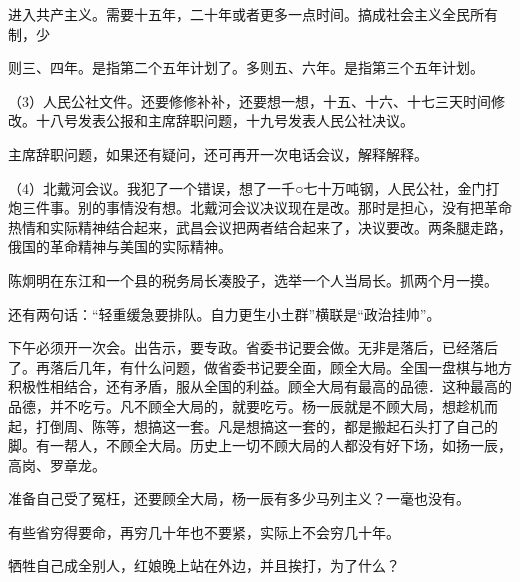 进入共产主义。需要十五年，二十年或者更多一点时间。搞成社会主义全民所有制，少

则三、四年。是指第二个五年计划了。多则五、六年。是指第三个五年计划。

（3）人民公社文件。还要修修补补，还要想一想，十五、十六、十七三天时间修改。十八号发表公报和主席辞职问题，十九号发表人民公社决议。

主席辞职问题，如果还有疑问，还可再开一次电话会议，解释解释。

（4）北戴河会议。我犯了一个错误，想了一千○七十万吨钢，人民公社，金门打炮三件事。别的事情没有想。北戴河会议决议现在是改。那时是担心，没有把革命热情和实际精神结合起来，武昌会议把两者结合起来了，决议要改。两条腿走路，俄国的革命精神与美国的实际精神。

陈炯明在东江和一个县的税务局长凑股子，选举一个人当局长。抓两个月一摸。

还有两句话：“轻重缓急要排队。自力更生小土群”横联是“政治挂帅”。

下午必须开一次会。出告示，要专政。省委书记要会做。无非是落后，已经落后了。再落后几年，有什么问题，做省委书记要全面，顾全大局。全国一盘棋与地方积极性相结合，还有矛盾，服从全国的利益。顾全大局有最高的品德．这种最高的品德，并不吃亏。凡不顾全大局的，就要吃亏。杨一辰就是不顾大局，想趁机而起，打倒周、陈等，想搞这一套。凡是想搞这一套的，都是搬起石头打了自己的脚。有一帮人，不顾全大局。历史上一切不顾大局的人都没有好下场，如扬一辰，高岗、罗章龙。

准备自己受了冤枉，还要顾全大局，杨一辰有多少马列主义？一毫也没有。

有些省穷得要命，再穷几十年也不要紧，实际上不会穷几十年。

牺牲自己成全别人，红娘晚上站在外边，并且挨打，为了什么？



